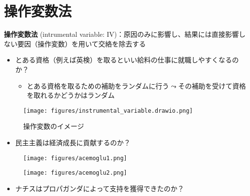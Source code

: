 \documentclass[
  xelatex,
  ja=standard]{bxjsarticle}
\providecommand{\tightlist}{%
  \setlength{\itemsep}{0pt}\setlength{\parskip}{0pt}}\usepackage{longtable,booktabs,array}
\begin{document}
\hypertarget{ux64cdux4f5cux5909ux6570ux6cd5}{%
\section{操作変数法}\label{ux64cdux4f5cux5909ux6570ux6cd5}}

\textbf{操作変数法} (intrumental variable:
IV)：原因のみに影響し、結果には直接影響しない要因（操作変数）を用いて交絡を除去する

\begin{itemize}
\tightlist
\item
  とある資格（例えば英検）を取るといい給料の仕事に就職しやすくなるのか？

  \begin{itemize}
  \tightlist
  \item
    とある資格を取るための補助をランダムに行う\(\leadsto\)その補助を受けて資格を取れるかどうかはランダム
  \end{itemize}
\end{itemize}

\begin{figure}[htpb]

{\centering \texttt{[image: figures/instrumental\_variable.drawio.png]}

}

\caption{操作変数のイメージ}

\end{figure}

\begin{itemize}
\tightlist
\item
  民主主義は経済成長に貢献するのか？
\end{itemize}

\begin{figure}[htpb]

{\centering \texttt{[image: figures/acemoglu1.png]}

}

\caption{\citet{acemoglu2001}}

\end{figure}

\begin{figure}[htpb]

{\centering \texttt{[image: figures/acemoglu2.png]}

}

\caption{\citet{acemoglu2001}}

\end{figure}

\begin{itemize}
\tightlist
\item
  ナチスはプロパガンダによって支持を獲得できたのか？
\end{itemize}
\end{document}
